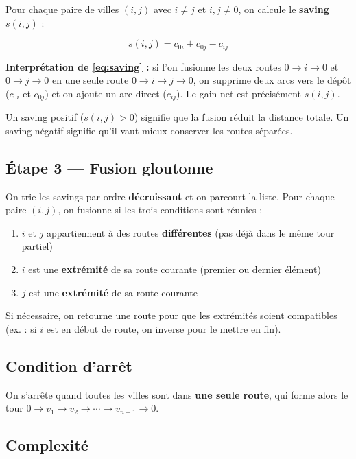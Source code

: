 \documentclass[12pt, a4paper]{article}
\begin{document}
Pour chaque paire de villes $(i, j)$ avec $i \neq j$ et $i,j \neq 0$, on calcule
le \textbf{saving} $s(i,j)$ :

\begin{equation}
  s(i, j) = c_{0i} + c_{0j} - c_{ij}
  \label{eq:saving}
\end{equation}

\textbf{Interprétation de \eqref{eq:saving} :} si l'on fusionne les deux routes
$0 \to i \to 0$ et $0 \to j \to 0$ en une seule route $0 \to i \to j \to 0$,
on supprime deux arcs vers le dépôt ($c_{0i}$ et $c_{0j}$) et on ajoute un arc
direct ($c_{ij}$). Le gain net est précisément $s(i,j)$.

Un saving positif ($s(i,j) > 0$) signifie que la fusion réduit la distance totale.
Un saving négatif signifie qu'il vaut mieux conserver les routes séparées.

\subsection{Étape 3 --- Fusion gloutonne}

On trie les savings par ordre \textbf{décroissant} et on parcourt la liste.
Pour chaque paire $(i,j)$, on fusionne si les trois conditions sont réunies :

\begin{enumerate}
  \item $i$ et $j$ appartiennent à des routes \textbf{différentes}
        (pas déjà dans le même tour partiel)
  \item $i$ est une \textbf{extrémité} de sa route courante
        (premier ou dernier élément)
  \item $j$ est une \textbf{extrémité} de sa route courante
\end{enumerate}

Si nécessaire, on retourne une route pour que les extrémités soient compatibles
(ex. : si $i$ est en début de route, on inverse pour le mettre en fin).

\subsection{Condition d'arrêt}

On s'arrête quand toutes les villes sont dans \textbf{une seule route},
qui forme alors le tour $0 \to v_1 \to v_2 \to \cdots \to v_{n-1} \to 0$.

\subsection{Complexité}
\end{document}
